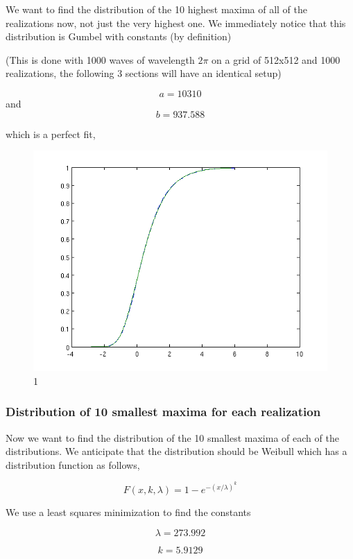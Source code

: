 \documentclass[12pt]{article}
\begin{document}
We want to find the distribution of the 10 highest maxima of all of the realizations now, not just the very highest one. We immediately notice that this distribution is Gumbel with constants (by definition)

(This is done with 1000 waves of wavelength $2\pi$ on a grid of 512x512 and 1000 realizations, the following 3 sections will have an identical setup)

\[a = 10310\]
and
\[b = 937.588\]

which is a perfect fit,

\begin{figure}[hpt]
	\centering
		\includegraphics[width=1.00\textwidth]{pnC_512_top10_gumbel.png}
	\caption{1}
	\label{fig:pnC_512_top10_gumbel}
\end{figure}


\subsubsection{Distribution of 10 smallest maxima for each realization}

Now we want to find the distribution of the 10 smallest maxima of each of the distributions. We anticipate that the distribution should be Weibull which has a distribution function as follows,

\[F(x,k,\lambda) = 1 - e^{-(x/\lambda)^{k}}\]

We use a least squares minimization to find the constants

\[\lambda = 273.992\]

\[k = 5.9129\]
\end{document}
